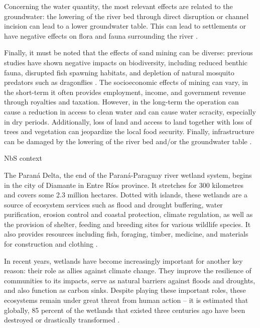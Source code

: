 Concerning the water quantity, the most relevant effects are related to the groundwater: the lowering of the river bed through direct disruption or channel incision can lead to a lower groundwater table. This can lead to settlements or have negative effects on flora and fauna surrounding the river \autocite{rentierEnvironmentalImpactsRiver2022}.

Finally, it must be noted that the effects of sand mining can be diverse: previous studies have shown negative impacts on biodiversity, including reduced benthic fauna, disrupted fish spawning habitats, and depletion of natural mosquito predators such as dragonflies \autocite{sand-mining-boek}. The socioeconomic effects of mining can vary, in the short-term it often provides employment, income, and government revenue through royalties and taxation. However, in the long-term the operation can cause a reduction in access to clean water and can cause water scracity, especially in dry periods. Additionally, loss of land and access to land together with loss of trees and vegetation can jeopardize the local food security. Finally, infrastructure can be damaged by the lowering of the river bed and/or the groundwater table \autocite{sand-mining-boek}.




NbS context

The Paraná Delta, the end of the Paraná-Paraguay river wetland system, begins in the city of Diamante in Entre Ríos province. It stretches for 300 kilometres and covers some 2.3 million hectares. Dotted with islands, these wetlands are a source of ecosystem services such as flood and drought buffering, water purification, erosion control and coastal protection, climate regulation, as well as the provision of shelter, feeding and breeding sites for various wildlife species. It also provides resources including fish, foraging, timber, medicine, and materials for construction and clothing \autocite{hibaParanaRiverEcological2024}.

In recent years, wetlands have become increasingly important for another key reason: their role as allies against climate change. They improve the resilience of communities to its impacts, serve as natural barriers against floods and droughts, and also function as carbon sinks. Despite playing these important roles, these ecosystems remain under great threat from human action – it is estimated that globally, 85 percent of the wetlands that existed three centuries ago have been destroyed or drastically transformed \autocite{hibaParanaRiverEcological2024}.


